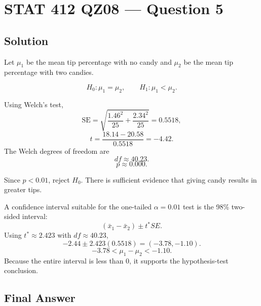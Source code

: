 \documentclass[11pt]{article}
\begin{document}
\section*{STAT 412 QZ08 --- Question 5}

\subsection*{Solution}

Let \(\mu_1\) be the mean tip percentage with no candy and \(\mu_2\) be the mean tip percentage with two candies.

\[
H_0:\mu_1=\mu_2,\qquad H_1:\mu_1<\mu_2.
\]

Using Welch's test,
\[
\text{SE}=\sqrt{\frac{1.46^2}{25}+\frac{2.34^2}{25}}=0.5518,
\]
\[
t=\frac{18.14-20.58}{0.5518}=-4.42.
\]
The Welch degrees of freedom are
\[
df\approx40.23.
\]
\[
p\approx0.000.
\]

Since \(p<0.01\), reject \(H_0\). There is sufficient evidence that giving candy results in greater tips.

A confidence interval suitable for the one-tailed \(\alpha=0.01\) test is the 98\% two-sided interval:
\[
(\bar{x}_1-\bar{x}_2)\pm t^*SE.
\]
Using \(t^*\approx2.423\) with \(df\approx40.23\),
\[
-2.44\pm 2.423(0.5518)=(-3.78,-1.10).
\]
\[
-3.78<\mu_1-\mu_2<-1.10.
\]
Because the entire interval is less than 0, it supports the hypothesis-test conclusion.

\subsection*{Final Answer}

\end{document}
